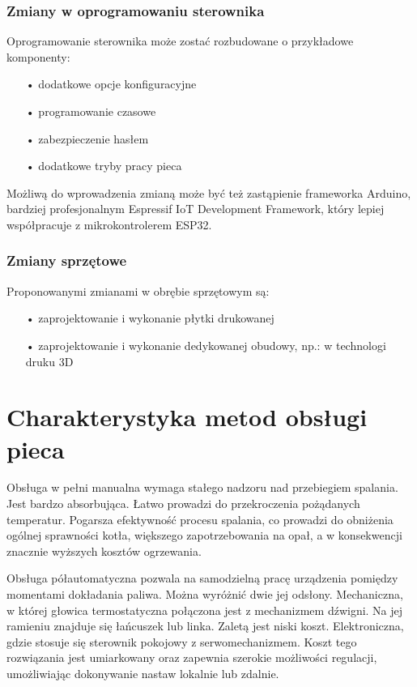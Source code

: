 \documentclass[11pt]{report}
\begin{document}
 \subsection{Zmiany w oprogramowaniu sterownika}
 Oprogramowanie sterownika może zostać rozbudowane o przykładowe komponenty:
 \begin{enumerate}
 \item[•] dodatkowe opcje konfiguracyjne
 \item[•] programowanie czasowe
 \item[•] zabezpieczenie hasłem
 \item[•] dodatkowe tryby pracy pieca
 \end{enumerate}
 Możliwą do wprowadzenia zmianą może być też zastąpienie frameworka Arduino, bardziej profesjonalnym Espressif IoT Development Framework, który lepiej współpracuje z mikrokontrolerem ESP32.
 \subsection{Zmiany sprzętowe}
 Proponowanymi zmianami w obrębie sprzętowym są:
 \begin{enumerate}
 \item[•] zaprojektowanie i wykonanie płytki drukowanej
 \item[•] zaprojektowanie i wykonanie dedykowanej obudowy, np.: w technologi druku 3D
 \end{enumerate}
 

 \chapter{Charakterystyka metod obsługi pieca} 
 Obsługa w pełni manualna wymaga stałego nadzoru nad przebiegiem spalania. Jest bardzo absorbująca. Łatwo prowadzi do przekroczenia pożądanych temperatur. Pogarsza efektywność procesu spalania, co prowadzi do obniżenia ogólnej sprawności kotła, większego zapotrzebowania na opał, a w konsekwencji znacznie wyższych kosztów ogrzewania.
 
 Obsługa półautomatyczna pozwala na samodzielną pracę urządzenia pomiędzy momentami dokładania paliwa. Można wyróżnić dwie jej odsłony. Mechaniczna, w której głowica termostatyczna połączona jest z mechanizmem dźwigni. Na jej ramieniu znajduje się łańcuszek lub linka. Zaletą jest niski koszt. Elektroniczna, gdzie stosuje się sterownik pokojowy z serwomechanizmem. Koszt tego rozwiązania jest umiarkowany oraz zapewnia szerokie możliwości regulacji, umożliwiając dokonywanie nastaw lokalnie lub zdalnie. 
 
\end{document}
